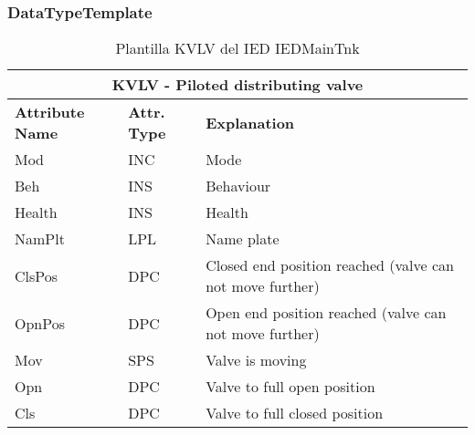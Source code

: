     \subsubsection{DataTypeTemplate}
    \begin{table}[H]
    \begin{center}
    \begin{tabular}{|l|l|p{8.5cm}|}
            \hline
            \multicolumn{3}{|c|}{\cellcolor[gray]{0.8} \textbf{ KVLV}  - Piloted distributing valve} \\
            \hline
            \textbf{Attribute Name} & \textbf{Attr. Type} & \textbf{Explanation} \\
            \hline 
            Mod & INC & Mode \\
            \hline
            Beh & INS & Behaviour \\
            \hline
            Health & INS & Health \\
            \hline
            NamPlt & LPL & Name plate \\
            \hline
            ClsPos & DPC & Closed end position reached (valve can not move further) \\
            \hline
            OpnPos & DPC & Open end position reached (valve can not move further) \\
            \hline
            Mov & SPS & Valve is moving \\
            \hline
            Opn & DPC & Valve to full open position \\
            \hline
            Cls & DPC & Valve to full closed position \\
            \hline
    \end{tabular}
    \caption{Plantilla KVLV del IED IEDMainTnk}
    \label{table:lnTypeKVLV_piloted}
    \end{center}
    \end{table}
    
    
    